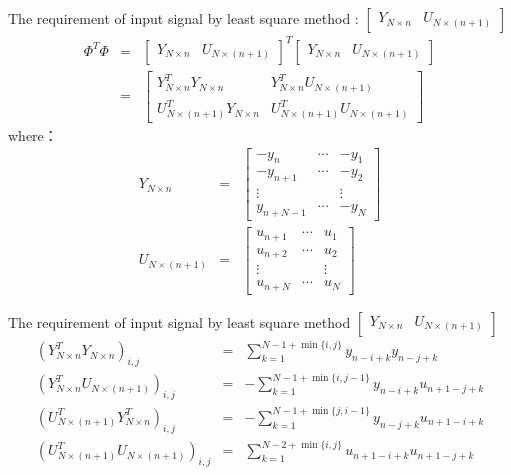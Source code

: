 \begin{frame}{The requirement of input signal by least square method : $\begin{bmatrix} Y_{N \times n} &  U_{N\times(n+1)}\end{bmatrix}$}
\begin{eqnarray*}
\Phi^T\Phi &=&\begin{bmatrix} Y_{N \times n} &  U_{N\times(n+1)}\end{bmatrix}^T\begin{bmatrix} Y_{N\times n} &  U_{N\times(n+1)}\end{bmatrix} \\
&=& \begin{bmatrix}
Y_{N \times n}^T Y_{N\times n}  & Y_{N \times n}^T U_{N\times(n+1)}  \\
U_{N\times(n+1)}^T Y_{N\times n}  &  U_{N\times(n+1)}^T U_{N\times(n+1)}
\end{bmatrix}
\end{eqnarray*}
where：
\begin{eqnarray*}
Y_{N\times n} &=& 
\begin{bmatrix}
-y_{n}    & \cdots & -y_{1}    \\
-y_{n+1}  & \cdots & -y_{2}    \\
\vdots    &        & \vdots   \\
y_{n+N-1} & \cdots & -y_{N}  
\end{bmatrix} \\
U_{N\times(n+1)} &=&
\begin{bmatrix}
u_{n+1} & \cdots & u_{1} \\
u_{n+2} & \cdots & u_{2} \\
\vdots &         & \vdots \\
u_{n+N} & \cdots & u_{N} 
\end{bmatrix} 
\end{eqnarray*}
\end{frame}

\begin{frame}{ The requirement of input signal by least square method $\begin{bmatrix} Y_{N \times n} &  U_{N\times(n+1)}\end{bmatrix}$}
\begin{eqnarray*}
(Y_{N\times n}^T Y_{N\times n})_{i,j} &=& \sum_{k=1}^{N-1+\min\{i,j\}}y_{n-i+k}y_{n-j+k} \\
(Y_{N\times n}^T U_{N\times (n+1)})_{i,j} &=& -\sum_{k=1}^{N-1+\min\{i,j-1\}}y_{n-i+k}u_{n+1-j+k} \\
(U_{N\times (n+1)}^T Y_{N\times n}^T )_{i,j} &=& -\sum_{k=1}^{N-1+\min\{j,i-1\}}y_{n-j+k}u_{n+1-i+k} \\
(U_{N\times (n+1)}^T U_{N\times (n+1)})_{i,j} &=& \sum_{k=1}^{N-2+\min\{i,j\}}u_{n+1-i+k}u_{n+1-j+k}
\end{eqnarray*}
\end{frame}

